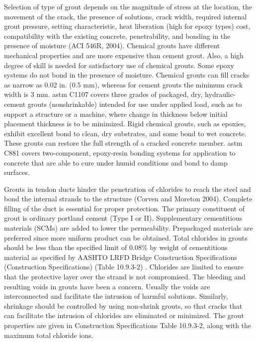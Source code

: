 Selection of type of grout depends on the magnitude of stress at the location, the movement of the crack, the presence of solutions, crack width, required internal grout pressure, setting characteristic, heat liberation (high for epoxy types) cost, compatibility with the existing concrete, penetrability, and bonding in the presence of moisture (ACI 546R, 2004). Chemical grouts have different mechanical properties and are more expensive than cement grout. Also, a high degree of skill is needed for satisfactory use of chemical grouts. Some epoxy systems do not bond in the presence of moisture. Chemical grouts can fill cracks as narrow as 0.02 in. (0.5 mm), whereas for cement grouts the minimum crack width is 3 mm. \acrshort*{astm} C1107 covers three grades of packaged, dry, hydraulic-cement grouts (nonshrinkable) intended for use under applied load, such as to support a structure or a machine, where change in thickness below initial placement thickness is to be minimized. Rigid chemical grouts, such as epoxies, exhibit excellent bond to clean, dry substrates, and some bond to wet concrete. These grouts can restore the full strength of a cracked concrete member. \acrshort*{astm} C881 covers two-component, epoxy-resin bonding systems for application to concrete that are able to cure under humid conditions and bond to damp surfaces.

Grouts in tendon ducts hinder the penetration of chlorides to reach the steel and bond the internal strands to the structure (Corven and Moreton 2004). Complete filling of the duct is essential for proper protection. The primary constituent of grout is ordinary portland cement (Type I or II). Supplementary cementitious materials (SCMs) are added to lower the permeability. Prepackaged materials are preferred since more uniform product can be obtained. Total chlorides in grouts should be less than the specified limit of 0.08\% by weight of cementitious material as specified by AASHTO LRFD Bridge Construction Specifications (Construction Specifications) (Table 10.9.3-2) \cite{aashto2010lc}. Chlorides are limited to ensure that the protective layer over the strand is not compromised. The bleeding and resulting voids in grouts have been a concern. Usually the voids are interconnected and facilitate the intrusion of harmful solutions. Similarly, shrinkage should be controlled by using non-shrink grouts, so that cracks that can facilitate the intrusion of chlorides are eliminated or minimized. The grout properties are given in Construction Specifications Table 10.9.3-2, along with the maximum total chloride ions.

